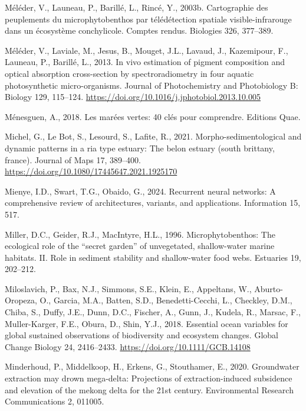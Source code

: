 \documentclass[
  letterpaper,
  11pt,
  english,
  singlespacing,
  headsepline]{MastersDoctoralThesis}
\newlength{\cslhangindent}
\newenvironment{CSLReferences}[2] %
 {\begin{list}{}{%
  \setlength{\itemindent}{0pt}
  \setlength{\leftmargin}{0pt}
  \setlength{\parsep}{0pt}
  \ifodd #1
   \setlength{\leftmargin}{\cslhangindent}
   \setlength{\itemindent}{-1\cslhangindent}
  \fi
  \setlength{\itemsep}{#2\baselineskip}}}
 {\end{list}}
\begin{document}
\begin{CSLReferences}{1}{0}
Méléder, V., Launeau, P., Barillé, L., Rincé, Y., 2003b. Cartographie
des peuplements du microphytobenthos par t{é}l{é}d{é}tection spatiale
visible-infrarouge dans un {é}cosyst{è}me conchylicole. Comptes rendus.
Biologies 326, 377--389.

Méléder, V., Laviale, M., Jesus, B., Mouget, J.L., Lavaud, J.,
Kazemipour, F., Launeau, P., Barillé, L., 2013. {In vivo estimation of
pigment composition and optical absorption cross-section by
spectroradiometry in four aquatic photosynthetic micro-organisms}.
Journal of Photochemistry and Photobiology B: Biology 129, 115--124.
\url{https://doi.org/10.1016/j.jphotobiol.2013.10.005}

Ménesguen, A., 2018. Les mar{é}es vertes: 40 cl{é}s pour comprendre.
Editions Quae.

Michel, G., Le Bot, S., Lesourd, S., Lafite, R., 2021.
Morpho-sedimentological and dynamic patterns in a ria type estuary: The
belon estuary (south brittany, france). Journal of Maps 17, 389--400.
\url{https://doi.org/10.1080/17445647.2021.1925170}

Mienye, I.D., Swart, T.G., Obaido, G., 2024. Recurrent neural networks:
A comprehensive review of architectures, variants, and applications.
Information 15, 517.

Miller, D.C., Geider, R.J., MacIntyre, H.L., 1996. Microphytobenthos:
The ecological role of the {``secret garden''} of unvegetated,
shallow-water marine habitats. II. Role in sediment stability and
shallow-water food webs. Estuaries 19, 202--212.

Miloslavich, P., Bax, N.J., Simmons, S.E., Klein, E., Appeltans, W.,
Aburto-Oropeza, O., Garcia, M.A., Batten, S.D., Benedetti-Cecchi, L.,
Checkley, D.M., Chiba, S., Duffy, J.E., Dunn, D.C., Fischer, A., Gunn,
J., Kudela, R., Marsac, F., Muller-Karger, F.E., Obura, D., Shin, Y.J.,
2018. Essential ocean variables for global sustained observations of
biodiversity and ecosystem changes. Global Change Biology 24,
2416--2433. \url{https://doi.org/10.1111/GCB.14108}

Minderhoud, P., Middelkoop, H., Erkens, G., Stouthamer, E., 2020.
Groundwater extraction may drown mega-delta: Projections of
extraction-induced subsidence and elevation of the mekong delta for the
21st century. Environmental Research Communications 2, 011005.


\end{CSLReferences}
\end{document}
